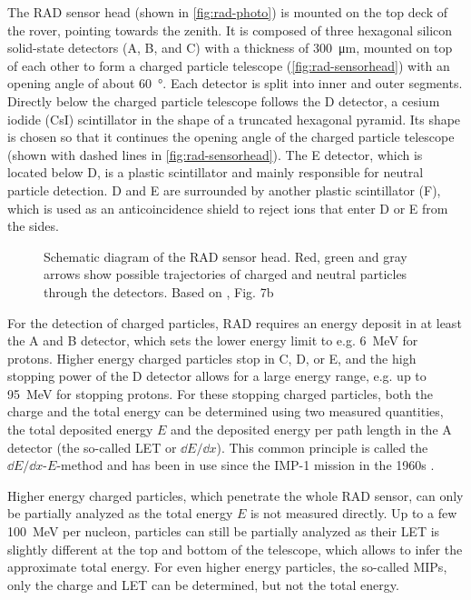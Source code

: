 The \ac{RAD} sensor head (shown in \autoref{fig:rad-photo}) is mounted on the top deck of the rover, pointing towards the zenith. It is composed of three hexagonal silicon solid-state detectors (A, B, and C) with a thickness of \SI{300}{\micro\meter}, mounted on top of each other to form a charged particle telescope (\autoref{fig:rad-sensorhead}) with an opening angle of about \SI{60}{\degree}. Each detector is split into inner and outer segments.
Directly below the charged particle telescope follows the D detector, a cesium iodide (CsI) scintillator in the shape of a truncated hexagonal pyramid. Its shape is chosen so that it continues the opening angle of the charged particle telescope (shown with dashed lines in \autoref{fig:rad-sensorhead}). The E detector, which is located below D, is a plastic scintillator and mainly responsible for neutral particle detection. D and E are surrounded by another plastic scintillator (F), which is used as an anticoincidence shield to reject ions that enter D or E from the sides.

\begin{figure}
	\centering
	
	\caption[Schematic diagram of the \acs{RAD} sensor head]{Schematic diagram of the \ac{RAD} sensor head. Red, green and gray arrows show possible trajectories of charged and neutral particles through the detectors. Based on      \textcite{Hassler-2012-MSLRAD}, Fig. 7b}
	\label{fig:rad-sensorhead}
\end{figure}

For the detection of charged particles, \ac{RAD} requires an energy deposit in at least the A and B detector, which sets the lower energy limit to e.g. \SI{6}{\mega\electronvolt} for protons. Higher energy charged particles stop in C, D, or E, and the high stopping power of the D detector allows for a large energy range, e.g. up to \SI{95}{\mega\electronvolt} for stopping protons. For these stopping charged particles, both the charge and the total energy can be determined using two measured quantities, the total deposited energy $E$ and the deposited energy per path length in the A detector (the so-called \ac{LET} or $\dd E/\dd x$). This common principle is called the $\dd E/\dd x$-$E$-method and has been in use since the IMP-1 mission in the 1960s \citep{McDonald-1964}.

Higher energy charged particles, which penetrate the whole \ac{RAD} sensor, can only be partially analyzed as the total energy $E$ is not measured directly. Up to a few \SI{100}{\mega\electronvolt} per nucleon, particles can still be partially analyzed as their \ac{LET} is slightly different at the top and bottom of the telescope, which allows to infer the approximate total energy. For even higher energy particles, the so-called \acp{MIP}, only the charge and \ac{LET} can be determined, but not the total energy.

